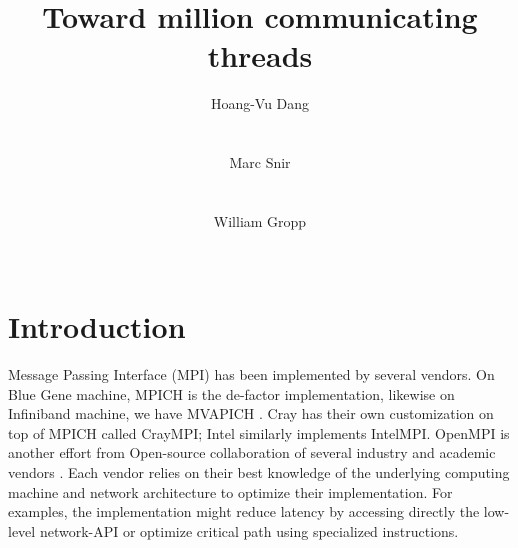 \documentclass{sig-alternate-05-2015}
\begin{document}




\title{Toward million communicating threads}

\author{
\alignauthor
Hoang-Vu Dang\\
\\
\\
%
\alignauthor
Marc Snir\\
\\
\\
%
\alignauthor
William Gropp
\\
\\
}

\maketitle


\section{Introduction}
Message Passing Interface (MPI) has been implemented by several vendors. On
Blue Gene machine, MPICH \cite{mpich} is the de-factor implementation, likewise
on Infiniband machine, we have MVAPICH \cite{mvapich}. Cray has their own
customization on top of MPICH called CrayMPI; Intel similarly implements
IntelMPI. OpenMPI is another effort from Open-source collaboration of several
industry and academic vendors \cite{openMPI}.  Each vendor relies on 
their best knowledge of the underlying computing machine and network
architecture to optimize their implementation. For examples, the implementation
might reduce latency by accessing directly the low-level network-API or
optimize critical path using specialized instructions.
\end{document}
